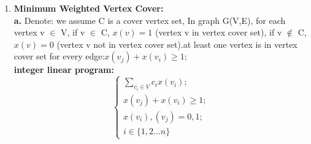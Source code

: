 \documentclass[12pt,a4paper]{article}
\theoremstyle{definition}
\begin{document}
\begin{enumerate}
    \item
    \textbf{Minimum Weighted Vertex Cover:} \\
        \textbf{a. }Denote: we assume C is a cover vertex set, In graph G(V,E), for each vertex v $\in$ V, if v $\in$ C, $x(v)=1$ (vertex v in vertex cover set), if v $\notin$  C, $x(v)=0$ (vertex v  not in vertex cover set).at least one vertex is in vertex cover set for every edge:$x(v_j)+x(v_i) \geq 1;$\\
        \textbf{integer linear program:}\\
        \begin{equation*}
          \begin{cases}
            \sum_{v_i \in V} c_ix(v_i);\\
            x(v_j)+x(v_i) \geq 1;\\
            x(v_i),(v_j)={0,1};\\
            i \in \{1,2 \dots n\}
          \end{cases}
        \end{equation*}


\end{enumerate}
\end{document}
